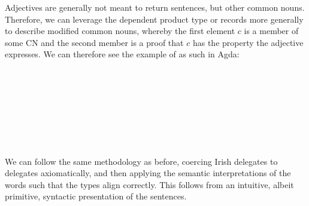 Adjectives are generally not meant to return sentences, but other common
nouns. Therefore, we can leverage the dependent product type or records more
generally to describe modified common nouns, whereby the first element $c$ is a
member of some CN and the second member is a proof that $c$ has the property the
adjective expresses. We can therefore see the example of  as
such in Agda:

\begin{code}[hide]%
\>[0]\AgdaSpace{}%
\AgdaSymbol{:}\AgdaSpace{}%
\AgdaSpace{}%
\AgdaSpace{}%
\<%
\\
\>[0]\AgdaSpace{}%
\AgdaSpace{}%
\AgdaSymbol{=}\AgdaSpace{}%
\AgdaSpace{}%
\AgdaSymbol{(}\AgdaSpace{}%
\AgdaSymbol{(}\AgdaSpace{}%
\AgdaSymbol{))}\<%
\end{code}
\begin{code}%
\>[0]\AgdaSpace{}%
\AgdaSpace{}%
\AgdaSymbol{:}\AgdaSpace{}%
\AgdaSpace{}%
\<%
\\
\>[0][@{}l@{\AgdaIndent{0}}]%
\>[2]\<%
\\
\>[2][@{}l@{\AgdaIndent{0}}]%
\>[4]\<%
\\
%
\>[2]\<%
\\
\>[2][@{}l@{\AgdaIndent{0}}]%
\>[4]\AgdaSpace{}%
\AgdaSymbol{:}\AgdaSpace{}%
\<%
\\
%
\>[4]\AgdaSpace{}%
\AgdaSymbol{:}\AgdaSpace{}%
\AgdaSpace{}%
\AgdaOperator{\AgdaFunction{\$}}\AgdaSpace{}%
\<%
\end{code}

We can follow the same methodology as before, coercing Irish delegates to
delegates axiomatically, and then applying the semantic interpretations of the
words such that the types align correctly. This follows from an intuitive,
albeit primitive, syntactic presentation of the sentences.


